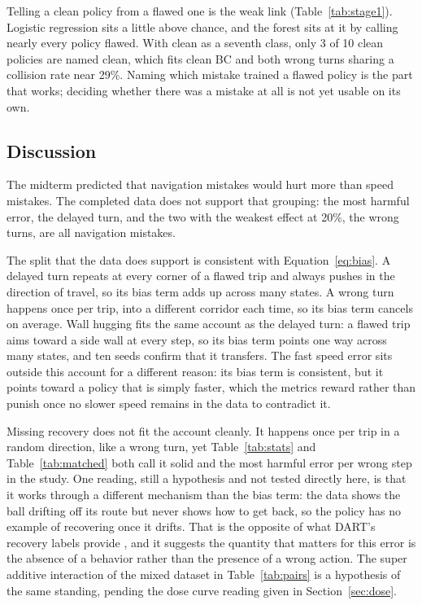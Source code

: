\documentclass[conference]{IEEEtran}
\begin{document}
Telling a clean policy from a flawed one is the weak link (Table~\ref{tab:stage1}). Logistic regression sits a
little above chance, and the forest sits at it by calling nearly every policy flawed. With clean as a seventh
class, only 3 of 10 clean policies are named clean, which fits clean BC and both wrong turns sharing a collision
rate near 29\%. Naming which mistake trained a flawed policy is the part that works; deciding whether there was a
mistake at all is not yet usable on its own.

\subsection{Discussion}
The midterm predicted that navigation mistakes would hurt more than speed mistakes. The completed data does not
support that grouping: the most harmful error, the delayed turn, and the two with the weakest effect at 20\%, the
wrong turns, are all navigation mistakes.

The split that the data does support is consistent with Equation~\eqref{eq:bias}. A delayed turn repeats at every
corner of a flawed trip and always pushes in the direction of travel, so its bias term adds up across many
states. A wrong turn happens once per trip, into a different corridor each time, so its bias term cancels on
average. Wall hugging fits the same account as the delayed turn: a flawed trip aims toward a side wall at every
step, so its bias term points one way across many states, and ten seeds confirm that it transfers. The fast
speed error sits outside this account for a different reason: its bias term is consistent, but
it points toward a policy that is simply faster, which the metrics reward rather than punish once no slower speed
remains in the data to contradict it.

Missing recovery does not fit the account cleanly. It happens once per trip in a random direction, like a wrong
turn, yet Table~\ref{tab:stats} and Table~\ref{tab:matched} both call it solid and the most harmful error per
wrong step in the study. One reading, still a hypothesis and not tested directly here, is that it works through a
different mechanism than the bias term: the data shows the ball drifting off its route but never shows how to get
back, so the policy has no example of recovering once it drifts. That is the opposite of what DART's recovery
labels provide \cite{dart}, and it suggests the quantity that matters for this error is the absence of a
behavior rather than the presence of a wrong action. The super additive interaction of the mixed dataset in
Table~\ref{tab:pairs} is a hypothesis of the same standing, pending the dose curve reading given in
Section~\ref{sec:dose}.
\end{document}
